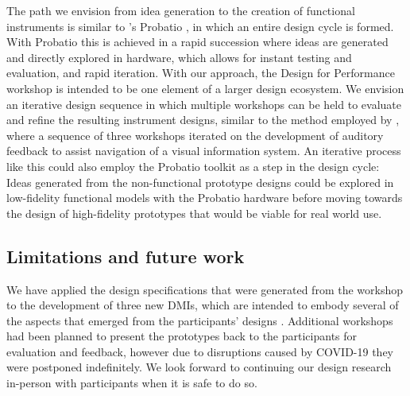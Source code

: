 \documentclass[letterpaper, 12pt]{article}
\begin{document}
The path we envision from idea generation to the creation of functional instruments is similar to \citeauthor{Calegario2019}'s Probatio \citeyearpar{Calegario2019}, in which an entire design cycle is formed. With Probatio this is achieved in a rapid succession where ideas are generated and directly explored in hardware, which allows for instant testing and evaluation, and rapid iteration. 
With our approach, the Design for Performance workshop is intended to be one element of a larger design ecosystem. We envision an iterative design sequence in which multiple workshops can be held to evaluate and refine the resulting instrument designs, similar to the method employed by \citet{Absar2015}, where a sequence of three workshops iterated on the development of auditory feedback to assist navigation of a visual information system. An iterative process like this could also employ the Probatio toolkit as a step in the design cycle: Ideas generated from the non-functional prototype designs could be explored in low-fidelity functional models with the Probatio hardware before moving towards the design of high-fidelity prototypes that would be viable for real world use.

\subsection{Limitations and future work}
\label{ch3-sec:limitations-and-future-work}


We have applied the design specifications that were generated from the workshop to the development of three new DMIs, which are intended to embody several of the aspects that emerged from the participants' designs \citep{Sullivan2020nime}. Additional workshops had been planned to present the prototypes back to the participants for evaluation and feedback, however due to disruptions caused by COVID-19 they were postponed indefinitely. We look forward to continuing our design research in-person with participants when it is safe to do so.
\end{document}
